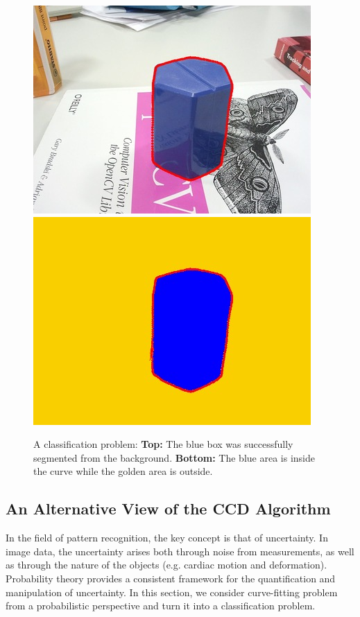 \documentclass[conference]{IEEEtran}
\begin{document}
\begin{figure}[htbp]
  \centering
  \includegraphics[width=\columnwidth]{images/divide1.jpg}\\
  \includegraphics[width=\columnwidth]{images/divide2.jpg}
  \caption{A classification problem: \textbf{Top:} The blue box was successfully segmented
    from the background. \textbf{Bottom:} The blue area is inside the curve while
    the golden area is outside.}
  \label{fig:divide}
\end{figure}

\subsection{An Alternative View of the CCD Algorithm}
\label{sec:overview}
In the field of pattern recognition, the key concept is that of
uncertainty. In image data, the uncertainty arises both
through noise from measurements, as well as through the nature of
the objects (e.g. cardiac motion and deformation). Probability theory
provides a consistent framework for the quantification and
manipulation of uncertainty.  In this section, we consider curve-fitting
problem from a probabilistic perspective and turn it into
a classification problem.
\end{document}
